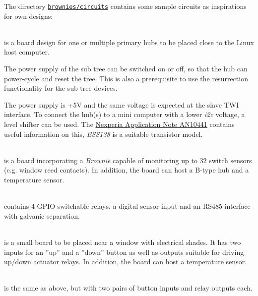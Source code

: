 \documentclass[12pt,english,parskip=half,headheight=19pt]{scrreprt}
\renewenvironment{description}[1][8ex]
  {\list{}{\labelwidth=5ex \leftmargin=#1 \let\makelabel\descriptionlabel}}
  {\endlist}
\newcommand{\refsrc}[1]{\href{#1}{\texttt{#1}}}     %
\begin{document}
The directory \refsrc{brownies/circuits} contains some sample circuits as inspirations for own designs:
\begin{description}
  \item[Hub Card (\code{hubcard})] ~ \\
    is a board design for one or multiple primary hubs to be placed close to the Linux host computer.

    The power supply of the sub tree can be switched on or off, so that the hub can power-cycle and
    reset the tree. This is also a prerequisite to use the resurrection functionality for the sub tree
    devices.

    The power supply is +5V and the same voltage is expected at the slave TWI interface. To connect
    the hub(s) to a mini computer with a lower \textit{i2c} voltage, a level shifter can be used.
    The \href{https://assets.nexperia.com/documents/application-note/AN10441.pdf}{Nexperia Application Note AN10441}
    contains useful information on this, \textit{BSS138} is a suitable transistor model.

  \item[Matrix 4x8 (\code{matrix4x8})] ~ \\
    is a board incorporating a \textit{Brownie} capable of monitoring up to 32 switch sensors
    (e.g. window reed contacts). In addition, the board can host a B-type hub and a temperature
    sensor.

  \item[Relais and RS485 (\code{relais_rs485})] ~ \\
    contains 4 GPIO-switchable relays, a digital sensor input and an RS485 interface with galvanic separation.

  \item[Window (\code{window})] ~ \\
    is a small board to be placed near a window with electrical shades.
    It has two inputs for an ''up'' and a ''down'' button as well as outputs suitable for driving up/down actuator relays.
    In addition, the board can host a temperature sensor.

  \item[Dual Window (\code{window_dual})] ~ \\
    is the same as above, but with two pairs of button inputs and relay outputs each.

\end{description}
\end{document}
